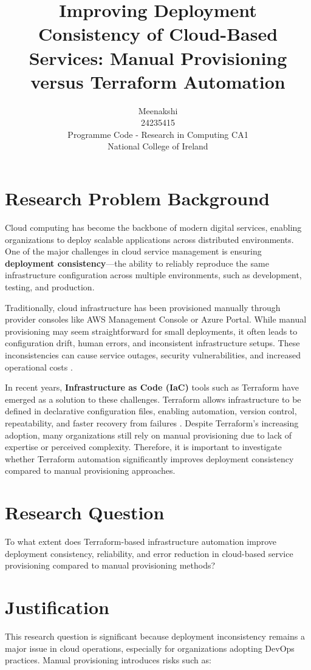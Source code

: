 \documentclass{article}
\title{ Improving Deployment Consistency of Cloud-Based Services: Manual Provisioning versus Terraform Automation}
\author{Meenakshi \\ 24235415 \\ Programme Code - Research in Computing CA1 \\ National College of Ireland}
\date{}
\begin{document}
\maketitle
\section{Research Problem Background}
Cloud computing has become the backbone of modern digital services, enabling organizations to deploy scalable applications across distributed environments. One of the major challenges in cloud service management is ensuring \textbf{deployment consistency}—the ability to reliably reproduce the same infrastructure configuration across multiple environments, such as development, testing, and production.

Traditionally, cloud infrastructure has been provisioned manually through provider consoles like AWS Management Console or Azure Portal. While manual provisioning may seem straightforward for small deployments, it often leads to configuration drift, human errors, and inconsistent infrastructure setups. These inconsistencies can cause service outages, security vulnerabilities, and increased operational costs \cite{kasarla2025implementing}.

In recent years, \textbf{Infrastructure as Code (IaC)} tools such as Terraform have emerged as a solution to these challenges. Terraform allows infrastructure to be defined in declarative configuration files, enabling automation, version control, repeatability, and faster recovery from failures \cite{pohjola2025mitigating}. Despite Terraform’s increasing adoption, many organizations still rely on manual provisioning due to lack of expertise or perceived complexity. Therefore, it is important to investigate whether Terraform automation significantly improves deployment consistency compared to manual provisioning approaches.


\section{Research Question}
To what extent does Terraform-based infrastructure automation improve deployment consistency, reliability, and error reduction in cloud-based service provisioning compared to manual provisioning methods?

\section{Justification}
This research question is significant because deployment inconsistency remains a major issue in cloud operations, especially for organizations adopting DevOps practices. Manual provisioning introduces risks such as:
\end{document}

